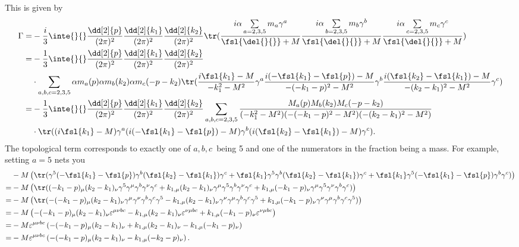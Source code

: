 This is given by
\begin{align*}
	\Gamma =& -\frac{i}{3}\inte{}{}\frac{\dd[2]{p}}{(2\pi)^{2}}\frac{\dd[2]{k_{1}}}{(2\pi)^{2}}\frac{\dd[2]{k_{2}}}{(2\pi)^{2}}\tr(\frac{i\alpha\sum\limits_{a = 2, 3, 5}m_{a}\gamma^{a}}{\fsl{\del{}{}} + M}\frac{i\alpha\sum\limits_{b = 2, 3, 5}m_{b}\gamma^{b}}{\fsl{\del{}{}} + M}\frac{i\alpha\sum\limits_{c = 2, 3, 5}m_{c}\gamma^{c}}{\fsl{\del{}{}} + M}) \\
	       =& -\frac{1}{3}\inte{}{}\frac{\dd[2]{p}}{(2\pi)^{2}}\frac{\dd[2]{k_{1}}}{(2\pi)^{2}}\frac{\dd[2]{k_{2}}}{(2\pi)^{2}} \\
	        &\cdot\sum\limits_{a, b, c = 2, 3, 5}\alpha m_{a}(p)\alpha m_{b}(k_{2})\alpha m_{c}(-p - k_{2})\tr(\frac{i\fsl{k_{1}} - M}{-k_{1}^{2} - M^{2}}\gamma^{a}\frac{i(-\fsl{k_{1}} - \fsl{p}) - M}{-(-k_{1} - p)^{2} - M^{2}}\gamma^{b}\frac{i(\fsl{k_{2}} - \fsl{k_{1}}) - M}{-(k_{2} - k_{1})^{2} - M^{2}}\gamma^{c}) \\
	       =& -\frac{1}{3}\inte{}{}\frac{\dd[2]{p}}{(2\pi)^{2}}\frac{\dd[2]{k_{1}}}{(2\pi)^{2}}\frac{\dd[2]{k_{2}}}{(2\pi)^{2}}\sum\limits_{a, b, c = 2, 3, 5}\frac{M_{a}(p)M_{b}(k_{2})M_{c}(-p - k_{2})}{(-k_{1}^{2} - M^{2})(-(-k_{1} - p)^{2} - M^{2})(-(k_{2} - k_{1})^{2} - M^{2})} \\
	        &\cdot\tr((i\fsl{k_{1}} - M)\gamma^{a}(i(-\fsl{k_{1}} - \fsl{p}) - M)\gamma^{b}(i(\fsl{k_{2}} - \fsl{k_{1}}) - M)\gamma^{c}).
\end{align*}
The topological term corresponds to exactly one of $a, b, c$ being 5 and one of the numerators in the fraction being a mass. For example, setting $a = 5$ nets you
\begin{align*}
	 &-M\left(\tr(\gamma^{5}(-\fsl{k_{1}} - \fsl{p})\gamma^{b}(\fsl{k_{2}} - \fsl{k_{1}})\gamma^{c} + \fsl{k_{1}}\gamma^{5}\gamma^{b}(\fsl{k_{2}} - \fsl{k_{1}})\gamma^{c} + \fsl{k_{1}}\gamma^{5}(-\fsl{k_{1}} - \fsl{p})\gamma^{b}\gamma^{c})\right) \\
	=& -M\left(\tr((-k_{1} - p)_{\mu}(k_{2} - k_{1})_{\nu}\gamma^{5}\gamma^{\mu}\gamma^{b}\gamma^{\nu}\gamma^{c} + k_{1, \mu}(k_{2} - k_{1})_{\nu}\gamma^{\mu}\gamma^{5}\gamma^{b}\gamma^{\nu}\gamma^{c} + k_{1, \mu}(-k_{1} - p)_{\nu}\gamma^{\mu}\gamma^{5}\gamma^{\nu}\gamma^{b}\gamma^{c})\right) \\
	=& -M\left(\tr(-(-k_{1} - p)_{\mu}(k_{2} - k_{1})_{\nu}\gamma^{\mu}\gamma^{\nu}\gamma^{b}\gamma^{c}\gamma^{5} - k_{1, \mu}(k_{2} - k_{1})_{\nu}\gamma^{\nu}\gamma^{\mu}\gamma^{b}\gamma^{c}\gamma^{5} + k_{1, \mu}(-k_{1} - p)_{\nu}\gamma^{\nu}\gamma^{\mu}\gamma^{b}\gamma^{c}\gamma^{5})\right) \\
	=& -M\left(-(-k_{1} - p)_{\mu}(k_{2} - k_{1})_{\nu}\varepsilon^{\mu\nu bc} - k_{1, \mu}(k_{2} - k_{1})_{\nu}\varepsilon^{\nu\mu bc} + k_{1, \mu}(-k_{1} - p)_{\nu}\varepsilon^{\nu\mu bc}\right) \\
	=& -M\varepsilon^{\mu\nu bc}\left(-(-k_{1} - p)_{\mu}(k_{2} - k_{1})_{\nu} + k_{1, \mu}(k_{2} - k_{1})_{\nu} - k_{1, \mu}(-k_{1} - p)_{\nu}\right) \\
	=&  -M\varepsilon^{\mu\nu bc}\left(-(-k_{1} - p)_{\mu}(k_{2} - k_{1})_{\nu} - k_{1, \mu}(-k_{2} - p)_{\nu}\right).
\end{align*}

